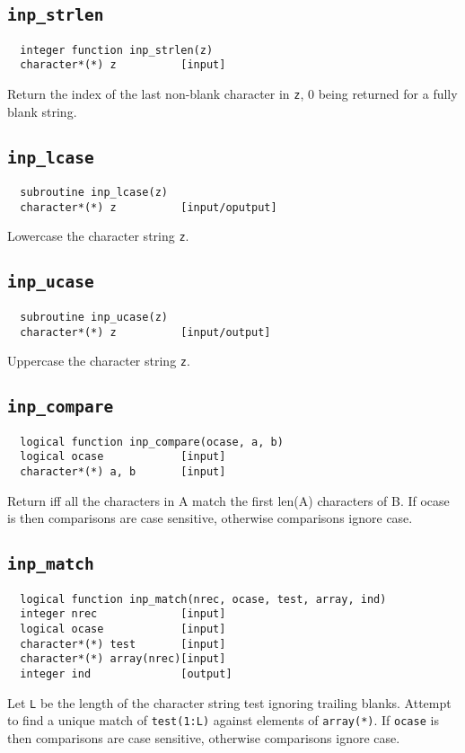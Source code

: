 \subsection{{\tt inp\_strlen}}
\begin{verbatim}
  integer function inp_strlen(z)
  character*(*) z          [input]
\end{verbatim}
Return the index of the last non-blank character in {\tt z}, 0 being
returned for a fully blank string.

\subsection{{\tt inp\_lcase}}
\begin{verbatim}
  subroutine inp_lcase(z)
  character*(*) z          [input/oputput]
\end{verbatim}
Lowercase the character string {\tt z}.

\subsection{{\tt inp\_ucase}}
\begin{verbatim}
  subroutine inp_ucase(z)
  character*(*) z          [input/output]
\end{verbatim}
Uppercase the character string {\tt z}.

\subsection{{\tt inp\_compare}}
\begin{verbatim}
  logical function inp_compare(ocase, a, b)
  logical ocase            [input]
  character*(*) a, b       [input]
\end{verbatim}
Return \TRUE iff all the characters in A match the first len(A)
characters of B.  If ocase is \TRUE then comparisons are case
sensitive, otherwise comparisons ignore case.

\subsection{{\tt inp\_match}}
\begin{verbatim}
  logical function inp_match(nrec, ocase, test, array, ind)
  integer nrec             [input]
  logical ocase            [input]
  character*(*) test       [input]
  character*(*) array(nrec)[input]
  integer ind              [output]
\end{verbatim}
Let {\tt L} be the length of the character string test ignoring
trailing blanks.  Attempt to find a unique match of \verb+test(1:L)+
against elements of \verb+array(*)+.  If \verb+ocase+ is \TRUE then
comparisons are case sensitive, otherwise comparisons ignore case.

